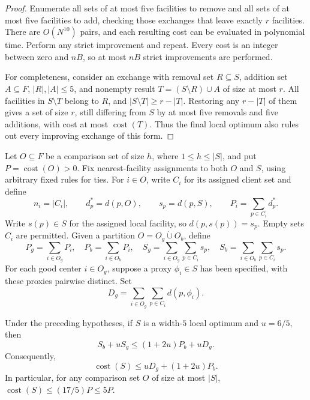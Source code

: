 \begin{proof}
Enumerate all sets of at most five facilities to remove and all sets of at
most five facilities to add, checking those exchanges that leave exactly
$r$ facilities.  There are $O(N^{10})$ pairs, and each resulting cost can
be evaluated in polynomial time.  Perform any strict improvement and
repeat.  Every cost is an integer between zero and $nB$, so at most $nB$
strict improvements are performed.

For completeness, consider an exchange with removal set $R\subseteq S$,
addition set $A\subseteq F$, $|R|,|A|\le5$, and nonempty result
$T=(S\setminus R)\cup A$ of size at most $r$.  All facilities in $S\setminus T$
belong to $R$, and
$|S\setminus T|\ge r-|T|$.  Restoring any $r-|T|$ of them gives a set of
size $r$, still differing from $S$ by at most five removals and five
additions, with cost at most $\operatorname{cost}(T)$.  Thus the final local
optimum also rules out every improving exchange of this form.
\end{proof}

Let $O\subseteq F$ be a comparison set of size $h$, where
$1\le h\le |S|$, and put $P=\operatorname{cost}(O)>0$.  Fix nearest-facility
assignments to both $O$ and $S$, using arbitrary fixed rules for ties.
For $i\in O$, write $C_i$ for its assigned client set and define
\[
 n_i=|C_i|,\qquad
 d_p^*=d(p,O),\qquad s_p=d(p,S),\qquad
 P_i=\sum_{p\in C_i}d_p^*.
\]
Write $s(p)\in S$ for the assigned local facility, so
$d(p,s(p))=s_p$.  Empty sets $C_i$ are permitted.  Given a partition
$O=O_g\mathbin{\dot\cup}O_b$, define
\[
 P_g=\sum_{i\in O_g}P_i,\quad P_b=\sum_{i\in O_b}P_i,\quad
 S_g=\sum_{i\in O_g}\sum_{p\in C_i}s_p,\quad
 S_b=\sum_{i\in O_b}\sum_{p\in C_i}s_p.
\]
For each good center $i\in O_g$, suppose a proxy $\phi_i\in S$ has been
specified, with these proxies pairwise distinct.  Set
\[
 D_g=\sum_{i\in O_g}\sum_{p\in C_i}d(p,\phi_i).
\]

\begin{lemma}
\label{loc:swap}
Under the preceding hypotheses, if $S$ is a width-$5$ local optimum and
$u=6/5$, then
\begin{equation}
 S_b+uS_g\le (1+2u)P_b+uD_g.
 \label{loc:strong-swap}
\end{equation}
Consequently,
\begin{equation}
 \operatorname{cost}(S)\le uD_g+(1+2u)P_b.
 \label{loc:swap-bound}
\end{equation}
In particular, for any comparison set $O$ of size at most $|S|$,
$\operatorname{cost}(S)\le(17/5)P\le5P$.
\end{lemma}

